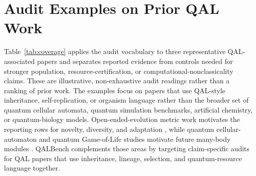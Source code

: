 \documentclass[11pt]{article}
\begin{document}
\FloatBarrier

\section{Audit Examples on Prior QAL Work}

Table~\ref{tab:coverage} applies the audit vocabulary to three representative QAL-associated papers and separates reported evidence from controls needed for stronger population, resource-certification, or computational-nonclassicality claims. These are illustrative, non-exhaustive audit readings rather than a ranking of prior work. The examples focus on papers that use QAL-style inheritance, self-replication, or organism language rather than the broader set of quantum cellular automata, quantum simulation benchmarks, artificial chemistry, or quantum-biology models. Open-ended-evolution metric work motivates the reporting rows for novelty, diversity, and adaptation \citep{bullock2006exploring,banzhaf2016defining,packard2019overview,dolson2019modes}, while quantum cellular-automaton and quantum Game-of-Life studies motivate future many-body modules \citep{bleh2012quantum,ney2022entanglement,escanez2026qgol}. QALBench complements those areas by targeting claim-specific audits for QAL papers that use inheritance, lineage, selection, and quantum-resource language together.
\end{document}
